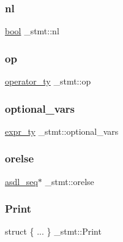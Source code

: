 \mbox{\label{struct__stmt_afc43b142b0d241edeba16fe35a872337}} 
\subsubsection{\texorpdfstring{nl}{nl}}
{\footnotesize\ttfamily \mbox{\hyperlink{asdl_8h_af6a258d8f3ee5206d682d799316314b1}{bool}} \+\_\+stmt\+::nl}

\mbox{\label{struct__stmt_a569578bba46e986e59d57381b4a14a26}} 
\subsubsection{\texorpdfstring{op}{op}}
{\footnotesize\ttfamily \mbox{\hyperlink{_python-ast_8h_a64ffe6085a53816a513038b9f1a04a9d}{operator\+\_\+ty}} \+\_\+stmt\+::op}

\mbox{\label{struct__stmt_afd56617c6467fd7d12983ccf75fdb6e4}} 
\subsubsection{\texorpdfstring{optional\_vars}{optional\_vars}}
{\footnotesize\ttfamily \mbox{\hyperlink{_python-ast_8h_a56d3705e020a071405094a220c4592bd}{expr\+\_\+ty}} \+\_\+stmt\+::optional\+\_\+vars}

\mbox{\label{struct__stmt_a66f6f20b75eafa36433ac6584cefbbd9}} 
\subsubsection{\texorpdfstring{orelse}{orelse}}
{\footnotesize\ttfamily \mbox{\hyperlink{structasdl__seq}{asdl\+\_\+seq}}$\ast$ \+\_\+stmt\+::orelse}

\mbox{\label{struct__stmt_a5f4b0a18eeb8601199dc5d99904c7413}} 
\subsubsection{\texorpdfstring{Print}{Print}}
{\footnotesize\ttfamily struct \{ ... \}   \+\_\+stmt\+::\+Print}

